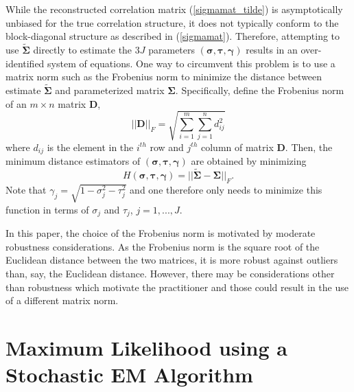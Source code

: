 \documentclass[12pt]{article}
\begin{document}
While the reconstructed correlation matrix (\ref{sigmamat_tilde}) is
asymptotically unbiased for the true correlation structure, it does not
typically conform to the block-diagonal structure as described in
(\ref{sigmamat}). Therefore, attempting to use $\boldsymbol{\tilde{\Sigma}}$ directly to estimate the $3J$ parameters $(\boldsymbol{\sigma},\boldsymbol{\tau},\boldsymbol{\gamma})$ results in an over-identified system of equations. One way to circumvent this problem is to use a matrix norm such as the Frobenius norm to minimize the distance between estimate $\boldsymbol{\tilde{\Sigma}}$ and parameterized matrix $\boldsymbol{\Sigma}$. Specifically, define the Frobenius norm of an $m \times
n$ matrix $\mathbf{D}$, 
\begin{equation*}
||\mathbf{D}||_F = \sqrt{\sum_{i = 1}^m \sum_{j = 1}^n d_{ij}^2}
\end{equation*}
where $d_{ij}$ is the element in the $i^{th}$ row and $j^{th}$ column of
matrix $\mathbf{D}$. Then, the minimum distance estimators of $(\boldsymbol{\sigma},\boldsymbol{\tau},\boldsymbol{\gamma})$ are obtained by minimizing
\begin{equation*}
H(\boldsymbol{\sigma},\boldsymbol{\tau},\boldsymbol{\gamma}) = ||\boldsymbol{\tilde{\Sigma}}-\boldsymbol{\Sigma}||_F.
\end{equation*}
Note that $\gamma_j = \sqrt{1-\sigma_j^2-\tau_j^2}$ and one therefore only needs to minimize this function in terms of $\sigma_j$
and $\tau_j$, $j = 1, ..., J$.

In this paper, the choice of the Frobenius norm is motivated by moderate
robustness considerations. As the Frobenius norm is the square root of the
Euclidean distance between the two matrices, it is more robust against
outliers than, say, the Euclidean distance. However, there may be considerations other than robustness which motivate the practitioner and those could result in the use of a different matrix norm. 

\section{Maximum Likelihood using a Stochastic EM Algorithm}
\end{document}
